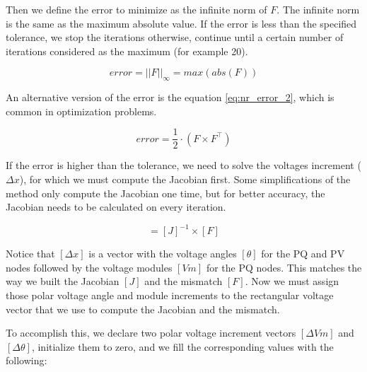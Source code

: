 \documentclass[nols,a4paper,twoside,notoc,fleqn]{tufte-book}
\begin{document}
Then we define the error to minimize as the infinite norm of $F$. The infinite norm is the same as the maximum absolute value. If the error is less than the specified tolerance, we stop the iterations otherwise, continue until a certain number of iterations considered as the maximum (for example 20).

\begin{equation}
error = ||F||_{\infty} = max(abs(F))
\label{eq:nr_error}
\end{equation}

 

An alternative version of the error is the equation \ref{eq:nr_error_2}, which is common in optimization problems.

\begin{equation}
error = \frac{1}{2} \cdot (F \times F^\top)
\label{eq:nr_error_2}
\end{equation}


If the error is higher than the tolerance, we need to solve the voltages increment ($\Delta x$), for which we must compute the Jacobian first. Some simplifications of the method only compute the Jacobian one time, but for better accuracy, the Jacobian needs to be calculated on every iteration.


\begin{equation}
[\Delta x] = [J]^{-1} \times [F]
\label{eq:nr_solve}
\end{equation}

Notice that $[\Delta x]$ is a vector with the voltage angles $[\theta]$ for the PQ and PV nodes followed by the voltage modules $[Vm]$ for the PQ nodes. This matches the way we built the Jacobian $[J]$ and the mismatch $[F]$. Now we must assign those polar voltage angle and module increments to the rectangular voltage vector that we use to compute the Jacobian and the mismatch.

To accomplish this, we declare two polar voltage increment vectors $[\Delta Vm]$ and $[\Delta \theta]$, initialize them to zero, and we fill the corresponding values with the following:

\end{document}
